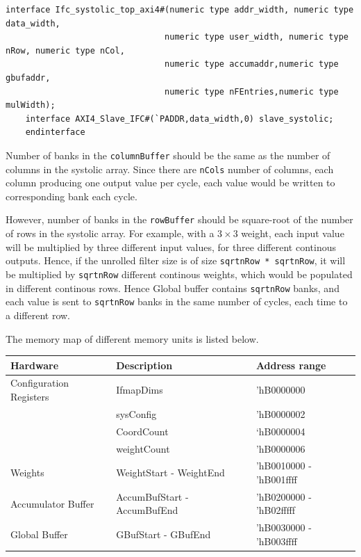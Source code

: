 \documentclass{article}
\begin{document}
\begin{verbatim}
interface Ifc_systolic_top_axi4#(numeric type addr_width, numeric type data_width, 
                                numeric type user_width, numeric type nRow, numeric type nCol, 
                                numeric type accumaddr,numeric type gbufaddr,  
                                numeric type nFEntries,numeric type mulWidth);
    interface AXI4_Slave_IFC#(`PADDR,data_width,0) slave_systolic;
    endinterface
\end{verbatim}

Number of banks in the \texttt{columnBuffer} should be the same as the number of columns in the systolic array. Since there are \texttt{nCols} number of columns, each column producing one output value per cycle, each value would be written to corresponding bank each cycle.

However, number of banks in the \texttt{rowBuffer} should be square-root of the number of rows in the systolic array. For example, with a $3 \times 3$ weight, each input value will be multiplied by three different input values, for three different continous outputs. Hence, if the unrolled filter size is of size \texttt{sqrtnRow * sqrtnRow}, it will be multiplied by \texttt{sqrtnRow} different continous weights, which would be populated in different continous rows. Hence Global buffer contains \texttt{sqrtnRow} banks, and each value is sent to \texttt{sqrtnRow} banks in the same number of cycles, each time to a different row.

The memory map of different memory units is listed below.
\begin{table}[h]
\begin{tabular}{|l|l|l|} \hline
Hardware                & Description                 & Address range           \\ \hline
Configuration Registers & IfmapDims                   & 'hB0000000              \\
                        & sysConfig                   & 'hB0000002              \\
                        & CoordCount                  & `hB0000004              \\
                        & weightCount                 & 'hB0000006              \\ \hline
Weights                 & WeightStart - WeightEnd     & 'hB0010000 - 'hB001ffff \\ \hline
Accumulator Buffer      & AccumBufStart - AccumBufEnd & 'hB0200000 - 'hB02fffff \\ \hline
Global Buffer           & GBufStart - GBufEnd         & 'hB0030000 - 'hB003ffff \\ \hline
\end{tabular}
\end{table}
\end{document}
